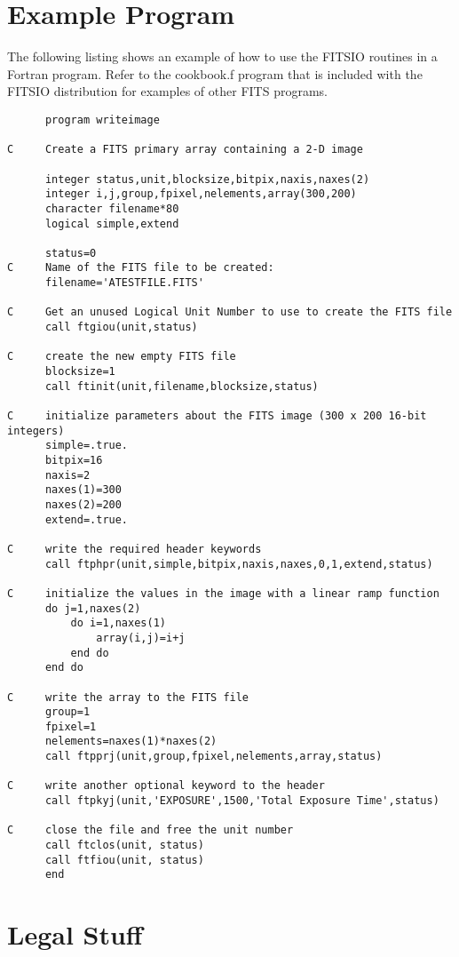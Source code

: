 \documentclass[11pt]{book}
\begin{document}
\section{Example Program}

The following listing shows an example of how to use the FITSIO
routines in a Fortran program.  Refer to the cookbook.f program that
is included with the FITSIO distribution for examples of other
FITS programs.

\begin{verbatim}
      program writeimage

C     Create a FITS primary array containing a 2-D image

      integer status,unit,blocksize,bitpix,naxis,naxes(2)
      integer i,j,group,fpixel,nelements,array(300,200)
      character filename*80
      logical simple,extend

      status=0
C     Name of the FITS file to be created:
      filename='ATESTFILE.FITS'

C     Get an unused Logical Unit Number to use to create the FITS file
      call ftgiou(unit,status)

C     create the new empty FITS file
      blocksize=1
      call ftinit(unit,filename,blocksize,status)

C     initialize parameters about the FITS image (300 x 200 16-bit integers)
      simple=.true.
      bitpix=16
      naxis=2
      naxes(1)=300
      naxes(2)=200
      extend=.true.

C     write the required header keywords
      call ftphpr(unit,simple,bitpix,naxis,naxes,0,1,extend,status)

C     initialize the values in the image with a linear ramp function
      do j=1,naxes(2)
          do i=1,naxes(1)
              array(i,j)=i+j
          end do
      end do

C     write the array to the FITS file
      group=1
      fpixel=1
      nelements=naxes(1)*naxes(2)
      call ftpprj(unit,group,fpixel,nelements,array,status)

C     write another optional keyword to the header
      call ftpkyj(unit,'EXPOSURE',1500,'Total Exposure Time',status)

C     close the file and free the unit number
      call ftclos(unit, status)
      call ftfiou(unit, status)
      end
\end{verbatim}


\section{Legal Stuff}
\end{document}
